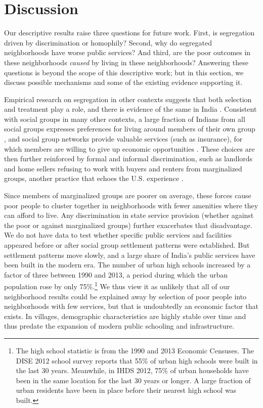 \documentclass[12pt]{article}
\begin{document}
\section{Discussion} \label{sec:discussion}

  Our descriptive results raise three questions for future work. First, is segregation driven by discrimination or homophily? Second, why do segregated neighborhoods have worse public services? And third, are the poor outcomes in these neighborhoods \textit{caused} by living in these neighborhoods? Answering these questions is beyond the scope of this descriptive work; but in this section, we discuss possible mechanisms and some of the existing evidence supporting it.

  Empirical research on segregation in other contexts suggests that both selection and treatment play a role, and there is evidence of the same in India \citep{blank2004measuring}. Consistent with social groups in many other contexts, a large fraction of Indians from all social groups expresses preferences for living around members of their own group \citep{pew2021religion2}, and social group networks provide valuable services (such as insurance), for which members are willing to give up economic opportunities \citep{munshi2006,munshi2014}. These choices are then further reinforced by formal and informal discrimination, such as landlords and home sellers refusing to work with buyers and renters from marginalized groups, another practice that echoes the U.S. experience \citep{banerjee1985caste, sachar2006, thorat2007legacy, madheswaran2007caste, ThoratHousing2015}.

  Since members of marginalized groups are poorer on average, these forces cause poor people to cluster together in neighborhoods with fewer amenities where they can afford to live. Any discrimination in state service provision (whether against the poor or against marginalized groups) further exacerbates that disadvantage. We do not have data to test whether specific public services and facilities appeared before or after social group settlement patterns were established. But settlement patterns move slowly, and a large share of India's public services have been built in the modern era. The number of urban high schools increased by a factor of three between 1990 and 2013, a period during which the urban population rose by only 75\%.\footnote{The high school statistic is from the 1990 and 2013 Economic Censuses. The DISE 2012 school survey reports that 55\% of urban high schools were built in the last 30 years. Meanwhile, in IHDS 2012, 75\% of urban households have been in the same location for the last 30 years or longer. A large fraction of urban residents have been in place before their nearest high school was built.} We thus view it as unlikely that all of our neighborhood results could be explained away by selection of poor people into neighborhoods with few services, but that is undoubtedly an economic factor that exists. In villages, demographic characteristics are highly stable over time and thus predate the expansion of modern public schooling and infrastructure.
\end{document}
